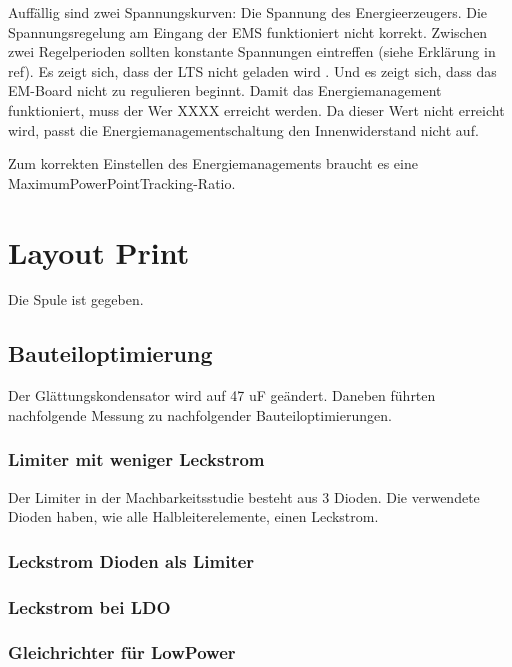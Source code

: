 Auffällig sind zwei Spannungskurven: Die Spannung des Energieerzeugers. Die Spannungsregelung am Eingang der EMS funktioniert nicht korrekt. Zwischen zwei Regelperioden sollten konstante Spannungen eintreffen (siehe Erklärung in ref). 
Es zeigt sich, dass der LTS nicht geladen wird . Und es zeigt sich, dass das EM-Board nicht zu regulieren beginnt. Damit das Energiemanagement funktioniert, muss der Wer XXXX erreicht werden. Da dieser Wert nicht erreicht wird, passt die Energiemanagementschaltung den Innenwiderstand nicht auf.

Zum korrekten Einstellen des Energiemanagements braucht es eine MaximumPowerPointTracking-Ratio.








\section{Layout Print}

Die Spule ist gegeben.

\subsection{Bauteiloptimierung}
Der Glättungskondensator wird auf 47 uF geändert. Daneben führten nachfolgende Messung zu nachfolgender Bauteiloptimierungen.

\subsubsection{Limiter mit weniger Leckstrom}
Der Limiter in der Machbarkeitsstudie besteht aus 3 Dioden. Die verwendete Dioden haben, wie alle Halbleiterelemente, einen Leckstrom. 

\subsubsection*{Leckstrom Dioden als Limiter}


\subsubsection*{Leckstrom bei LDO}



\subsubsection{Gleichrichter für LowPower}




